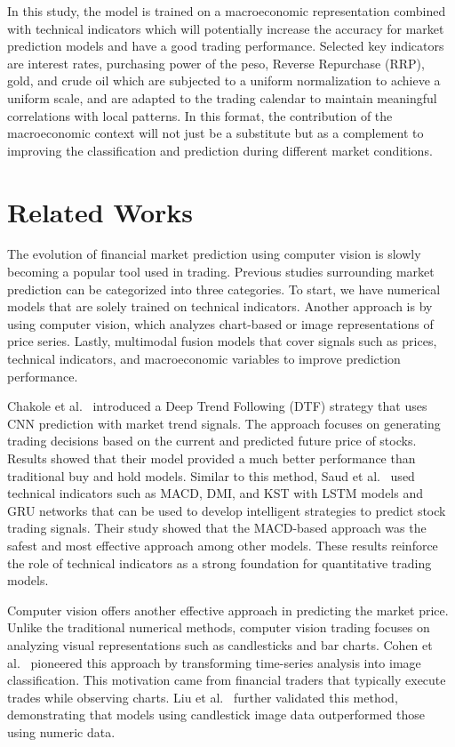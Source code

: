 \documentclass[12pt,a4paper]{article}
\begin{document}
	In this study, the model is trained on a macroeconomic representation combined with technical indicators which will potentially increase the accuracy for market prediction models and have a good trading performance. Selected key indicators are interest rates, purchasing power of the peso, Reverse Repurchase (RRP), gold, and crude oil which are subjected to a uniform normalization to achieve a uniform scale, and are adapted to the trading calendar to maintain meaningful correlations with local patterns. In this format, the contribution of the macroeconomic context will not just be a substitute but as a complement to improving the classification and prediction during different market conditions.



\section{Related Works}
The evolution of financial market prediction using computer vision is slowly becoming a popular tool used in trading. Previous studies surrounding market prediction can be categorized into three categories. To start, we have numerical models that are solely trained on technical indicators. Another approach is by using computer vision, which analyzes chart-based or image representations of price series. Lastly, multimodal fusion models that cover signals such as prices, technical indicators, and macroeconomic variables to improve prediction performance.

Chakole et al.\ \cite{chakole2021convolutional} introduced a Deep Trend Following (DTF) strategy that uses CNN prediction with market trend signals. The approach focuses on generating trading decisions based on the current and predicted future price of stocks. Results showed that their model provided a much better performance than traditional buy and hold models. Similar to this method, Saud et al.\ \cite{saud2024technical} used technical indicators such as MACD, DMI, and KST with LSTM models and GRU networks that can be used to develop intelligent strategies to predict stock trading signals. Their study showed that the MACD-based approach was the safest and most effective approach among other models. These results reinforce the role of technical indicators as a strong foundation for quantitative trading models.

Computer vision offers another effective approach in predicting the market price. Unlike the traditional numerical methods, computer vision trading focuses on analyzing visual representations such as candlesticks and bar charts. Cohen et al.\ \cite{cohen2020trading} pioneered this approach by transforming time-series analysis into image classification. This motivation came from financial traders that typically execute trades while observing charts. Liu et al.\ \cite{liu2023automated} further validated this method, demonstrating that models using candlestick image data outperformed those using numeric data.
\end{document}
